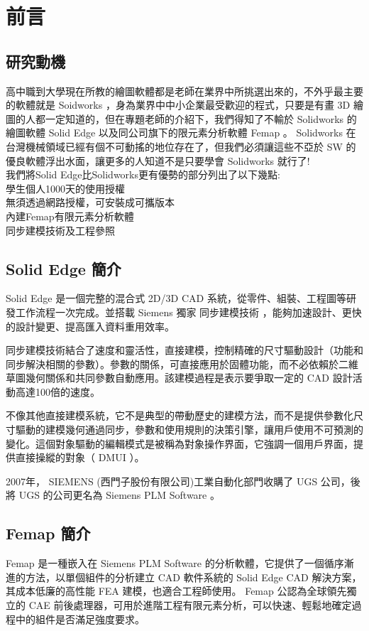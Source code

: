 \chapter{前言}
\renewcommand{\baselinestretch}{10.0} %
\setcounter{page}{1}  %
\fontsize{14pt}{2.5pt}\sectionef
\section{研究動機}
高中職到大學現在所教的繪圖軟體都是老師在業界中所挑選出來的，不外乎最主要的軟體就是 Soidworks ，身為業界中中小企業最受歡迎的程式，只要是有畫 3D 繪圖的人都一定知道的，但在專題老師的介紹下，我們得知了不輸於 Solidworks 的繪圖軟體 Solid Edge 以及同公司旗下的限元素分析軟體 Femap 。 Solidworks 在台灣機械領域已經有個不可動搖的地位存在了，但我們必須讓這些不亞於 SW 的優良軟體浮出水面，讓更多的人知道不是只要學會 Solidworks 就行了!\\
我們將Solid Edge比Solidworks更有優勢的部分列出了以下幾點:\\
  學生個人1000天的使用授權\\
  無須透過網路授權，可安裝成可攜版本\\
  內建Femap有限元素分析軟體\\
  同步建模技術及工程參照\\
\section{Solid Edge 簡介}
Solid Edge 是一個完整的混合式 2D/3D CAD 系統，從零件、組裝、工程圖等研發工作流程一次完成。並搭載 Siemens 獨家 同步建模技術 ，能夠加速設計、更快的設計變更、提高匯入資料重用效率。

同步建模技術結合了速度和靈活性，直接建模，控制精確的尺寸驅動設計（功能和同步解決相關的參數）。參數的關係，可直接應用於固體功能，而不必依賴於二維草圖幾何關係和共同參數自動應用。該建模過程是表示要爭取一定的 CAD 設計活動高達100倍的速度。

不像其他直接建模系統，它不是典型的帶動歷史的建模方法，而不是提供參數化尺寸驅動的建模幾何通過同步，參數和使用規則的決策引擎，讓用戶使用不可預測的變化。這個對象驅動的編輯模式是被稱為對象操作界面，它強調一個用戶界面，提供直接操縱的對象（ DMUI ）。

2007年， SIEMENS (西門子股份有限公司)工業自動化部門收購了 UGS 公司，後將 UGS 的公司更名為 Siemens PLM Software 。 \\
\section{Femap 簡介}
 Femap 是一種嵌入在 Siemens PLM Software 的分析軟體，它提供了一個循序漸進的方法，以單個組件的分析建立 CAD 軟件系統的 Solid Edge CAD 解決方案，其成本低廉的高性能 FEA 建模，也適合工程師使用。 Femap 公認為全球領先獨立的 CAE 前後處理器，可用於進階工程有限元素分析，可以快速、輕鬆地確定過程中的組件是否滿足強度要求。 \\



\renewcommand{\baselinestretch}{0.5} %
